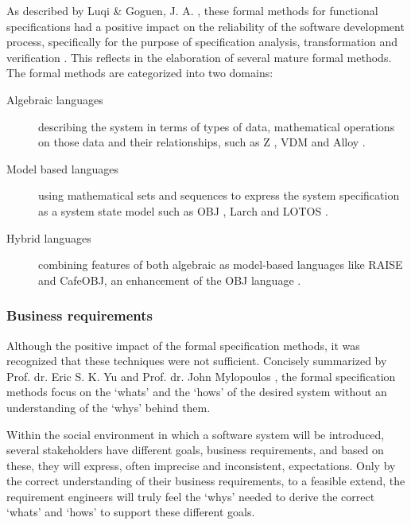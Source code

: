 As described by  Luqi \& Goguen, J. A. , these formal methods for functional specifications had a positive impact on the reliability of the software development process, specifically for the purpose of specification analysis, transformation and verification .
This  reflects  in the elaboration of several mature formal methods.
The formal methods are categorized into two domains:


\begin{description}
	\item[Algebraic languages] describing the system in terms of types of data, mathematical operations on those data and their relationships, such as Z , VDM  and Alloy .
	\item[Model based languages] using mathematical sets and sequences to express the system specification as a system state model such as OBJ , Larch  and LOTOS .
	\item[Hybrid languages] combining features of both algebraic as model-based languages like RAISE  and CafeOBJ, an enhancement of the OBJ language .
\end{description}

\subsubsection{Business requirements}
Although the positive impact of the formal specification methods, it was recognized that these techniques were not sufficient. Concisely summarized by Prof. dr. Eric S. K. Yu and Prof. dr. John Mylopoulos , the formal specification methods focus on the `whats' and the `hows' of the desired system without an understanding of the `whys' behind them. 

Within the social environment in which a software system will be introduced, several stakeholders have different goals,  business requirements, and based on these, they will express, often imprecise and inconsistent, expectations. Only by the correct understanding of their business requirements, to a feasible extend, the requirement engineers will truly feel the `whys' needed to derive the correct `whats' and `hows' to support these different goals.

